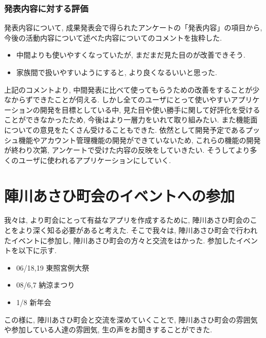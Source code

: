 \subsubsection{発表内容に対する評価}
発表内容について, 成果発表会で得られたアンケートの「発表内容」の項目から, 今後の活動内容について述べた内容についてのコメントを抜粋した.
\begin{itemize}
    \item 中間よりも使いやすくなっていたが, まだまだ見た目のが改善できそう.
    \item 家族間で扱いやすいようにすると, より良くなるいいと思った.
\end{itemize}
上記のコメントより, 中間発表に比べて使ってもらうための改善をすることが少なからずできたことが伺える. しかし全てのユーザにとって使いやすいアプリケーションの開発を目標としている中,
見た目や使い勝手に関して好評化を受けることができなかったため, 今後はより一層力をいれて取り組みたい.
また機能面についての意見をたくさん受けることもできた. 依然として開発予定であるプッシュ機能やアカウント管理機能の開発ができていないため,
これらの機能の開発が終わり次第, アンケートで受けた内容の反映をしていきたい. そうしてより多くのユーザに使われるアプリケーションにしていく.

\section{陣川あさひ町会のイベントへの参加}
我々は, より町会にとって有益なアプリを作成するために, 陣川あさひ町会のことをより深く知る必要があると考えた.
そこで我々は, 陣川あさひ町会で行われたイベントに参加し, 陣川あさひ町会の方々と交流をはかった. 参加したイベントを以下に示す.
\begin{itemize}
    \item 06/18,19 東照宮例大祭
    \item 08/6,7 納涼まつり
    \item 1/8 新年会
\end{itemize}
この様に, 陣川あさひ町会と交流を深めていくことで, 陣川あさひ町会の雰囲気や参加している人達の雰囲気, 生の声をお聞きすることができた. 
